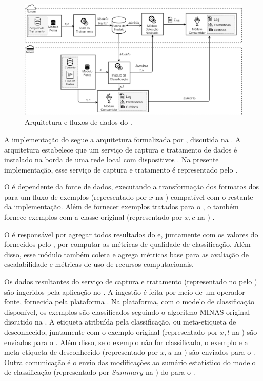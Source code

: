 \begin{figure}[ht]
\centering
\includegraphics[width=\textwidth]{figuras/mfog-arch-v3_pt-br.png}
\caption{Arquitetura e fluxos de dados do \mfog.}
\label{fig:arch}
\end{figure}

A implementação do \mfog segue a arquitetura \idsiot formalizada por
, discutida na .
A arquitetura \idsiot
estabelece que um serviço de
captura e tratamento de dados é instalado na borda de uma rede local com
dispositivos \iot.
Na presente implementação, esse serviço de captura e tratamento é representado
pelo \source.

O \source é dependente da fonte de dados, executando a transformação dos
formatos dos \datasets para um fluxo de exemplos (representado por $x$ na )
compatível com o restante da implementação.
Além de fornecer exemplos tratados para o \classify, o \source também fornece
exemplos com a classe original (representado por $x,c$ na )
.

O \sink é responsável por agregar todos resultados do \mfog e,
juntamente com os valores do \dataset fornecidos pelo \source, por computar
as métricas de qualidade de classificação.
Além disso, esse módulo também coleta e agrega métricas base para as avaliação de
escalabilidade e métricas de uso de recursos computacionais.

Os dados resultantes do serviço de captura e tratamento (representado no \mfog
pelo \source) são ingeridos pela aplicação no \classify. A ingestão é feita por
meio de um operador fonte, fornecida pela plataforma \flink.
Na plataforma, com o modelo de classificação disponível, os exemplos são
classificados seguindo o algoritmo MINAS original discutido na .
A etiqueta atribuída pela classificação, ou meta-etiqueta de desconhecido,
juntamente com o exemplo original (representado por $x,l$ na )
são enviados para o \sink.
Além disso, se o exemplo não for classificado, o exemplo e a meta-etiqueta de
desconhecido (representado por $x,u$ na ) são enviados para o
\detector.
Outra comunicação é o envio das modificações ao sumário estatístico do modelo de
classificação (representado por $Summary$ na ) do \classify para o
\detector.

